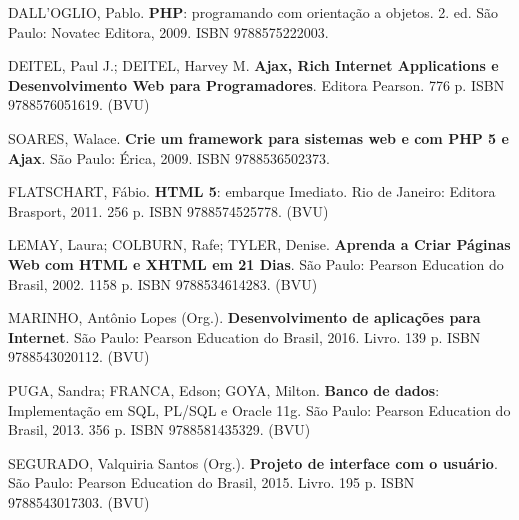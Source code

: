 \begin{pud}
\begin{bibbasica}
        \item DALL'OGLIO, Pablo. \textbf{PHP}: programando com orientação a objetos. 2. ed. São Paulo: Novatec Editora, 2009.  ISBN 9788575222003.
		\item DEITEL, Paul J.; DEITEL, Harvey M.  \textbf{Ajax, Rich Internet Applications e Desenvolvimento Web para Programadores}. Editora Pearson. 776 p. ISBN 9788576051619. (BVU)
		\item SOARES, Walace. \textbf{Crie um framework para sistemas web e com PHP 5 e Ajax}. São Paulo: Érica, 2009.  ISBN 9788536502373.
		
	\end{bibbasica}
	
	\begin{bibcomplementar}
    
	    
		\item FLATSCHART, F\'abio. \textbf{HTML 5}: embarque Imediato. Rio de Janeiro: Editora Brasport, 2011. 256 p. ISBN 9788574525778. (BVU)
		\item LEMAY, Laura; COLBURN, Rafe; TYLER, Denise. \textbf{Aprenda a Criar P\'aginas Web com HTML e XHTML em 21 Dias}.  São Paulo: Pearson Education do Brasil, 2002.  1158 p. ISBN 9788534614283. (BVU)
 		
 		\item MARINHO, Antônio Lopes (Org.). \textbf{Desenvolvimento de aplicações para Internet}. São Paulo: Pearson Education do Brasil, 2016. Livro. 139 p. ISBN 9788543020112. (BVU)
 		\item PUGA, Sandra; FRANCA, Edson; GOYA, Milton. \textbf{Banco de dados}: Implementa\c{c}\~ao em SQL, PL/SQL e Oracle 11g.  São Paulo: Pearson Education do Brasil, 2013. 356 p.  ISBN 9788581435329. (BVU)
 		\item SEGURADO, Valquiria Santos (Org.). \textbf{Projeto de interface com o usuário}. São Paulo: Pearson Education do Brasil, 2015. Livro. 195 p. ISBN 9788543017303. (BVU) 
		 
	\end{bibcomplementar}
	
	
	
\end{pud}

